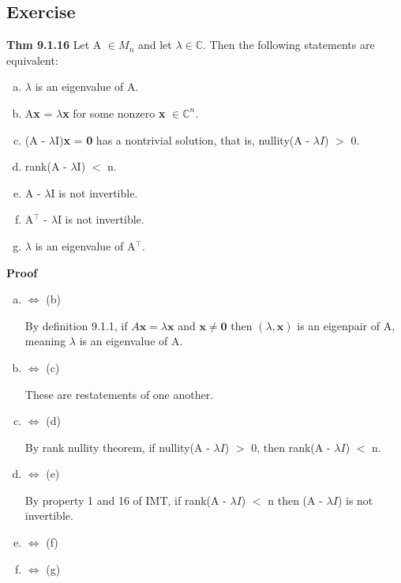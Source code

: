 \documentclass[12pt, letterpaper]{article}
\begin{document}
\subsection{Exercise}
\textbf{Thm 9.1.16} Let A $\in M_n$ and let $\lambda \in \mathbb{C}$. Then the following statements are equivalent:
\begin{enumerate}[(a)]
    \item $\lambda$ is an eigenvalue of A.
    \item A\textbf{x} = $\lambda$\textbf{x} for some nonzero \textbf{x} $\in \mathbb{C}^n$.
    \item (A - $\lambda$I)\textbf{x} = \textbf{0} has a nontrivial solution, that is, nullity(A - $\lambda I$) $>$ 0.
    \item rank(A - $\lambda$I) $<$ n.
    \item A - $\lambda$I is not invertible.
    \item A$^\top$ - $\lambda$I is not invertible.
    \item $\lambda$ is an eigenvalue of A$^\top$.
\end{enumerate}
\textbf{Proof}
\begin{enumerate}[(a)]
    \item $\Leftrightarrow$ (b) 
    
    By definition 9.1.1, if $A\mathbf{x}=\lambda\mathbf{x}$ and $\mathbf{x}\neq\mathbf{0}$ then $(\lambda,\mathbf{x})$
    is an eigenpair of A, meaning $\lambda$ is an eigenvalue of A.
    \item $\Leftrightarrow$ (c)
    
    These are restatements of one another.
    \item $\Leftrightarrow$ (d)
    
    By rank nullity theorem, if nullity(A - $\lambda I$) $>$ 0, then rank(A - $\lambda I$) $<$ n.
    \item $\Leftrightarrow$ (e) 
    
    By property 1 and 16 of IMT, if rank(A - $\lambda I$) $<$ n then (A - $\lambda I$) is not invertible.
    \item $\Leftrightarrow$ (f)
    
    
    \item $\Leftrightarrow$ (g)
    
    
\end{enumerate}
\end{document}
